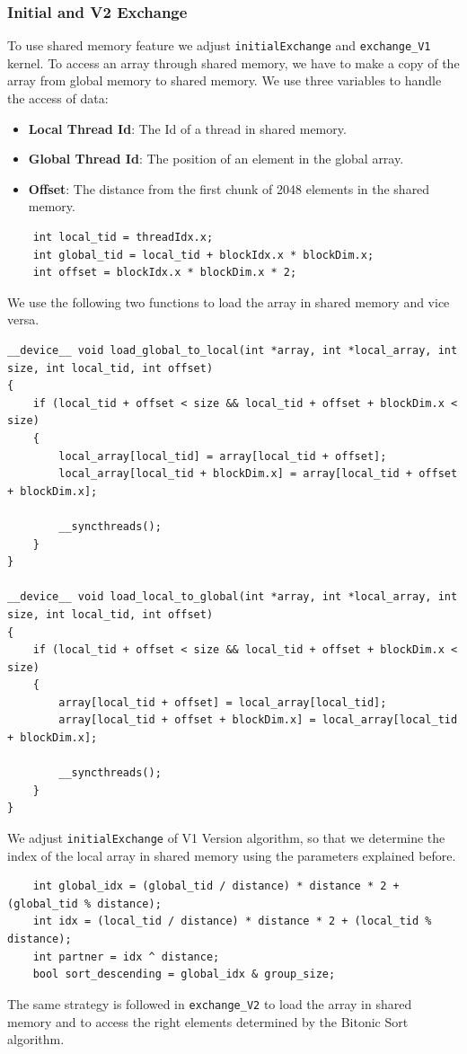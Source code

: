 \documentclass[a4paper,12pt]{article}
\begin{document}
\subsubsection*{Initial and V2 Exchange}
To use shared memory feature we adjust \texttt{initialExchange} and \texttt{exchange\_V1} kernel. To access an array through shared memory, we have to make a copy of the array from global memory to shared memory. We use three variables to handle the access of data:

\begin{itemize}
    \item \textbf{Local Thread Id}: The Id of a thread in shared memory.
    \item \textbf{Global Thread Id}: The position of an element in the global array.
    \item \textbf{Offset}: The distance from the first chunk of 2048 elements in the shared memory.
\end{itemize}

\begin{lstlisting}
    int local_tid = threadIdx.x;
    int global_tid = local_tid + blockIdx.x * blockDim.x;
    int offset = blockIdx.x * blockDim.x * 2;
\end{lstlisting}

We use the following two functions to load the array in shared memory and vice versa.
\begin{lstlisting}
__device__ void load_global_to_local(int *array, int *local_array, int size, int local_tid, int offset)
{
    if (local_tid + offset < size && local_tid + offset + blockDim.x < size)
    {
        local_array[local_tid] = array[local_tid + offset];
        local_array[local_tid + blockDim.x] = array[local_tid + offset + blockDim.x];

        __syncthreads();
    }
}

__device__ void load_local_to_global(int *array, int *local_array, int size, int local_tid, int offset)
{
    if (local_tid + offset < size && local_tid + offset + blockDim.x < size)
    {
        array[local_tid + offset] = local_array[local_tid];
        array[local_tid + offset + blockDim.x] = local_array[local_tid + blockDim.x];

        __syncthreads();
    }
}
\end{lstlisting}

We adjust \texttt{initialExchange} of V1 Version algorithm, so that we determine the index of the local array in shared memory using the parameters explained before.
\\
\begin{lstlisting}
    int global_idx = (global_tid / distance) * distance * 2 + (global_tid % distance);
    int idx = (local_tid / distance) * distance * 2 + (local_tid % distance);
    int partner = idx ^ distance;
    bool sort_descending = global_idx & group_size;
\end{lstlisting}
The same strategy is followed in \texttt{exchange\_V2} to load the array in shared memory and to access the right elements determined by the Bitonic Sort algorithm.
\end{document}
